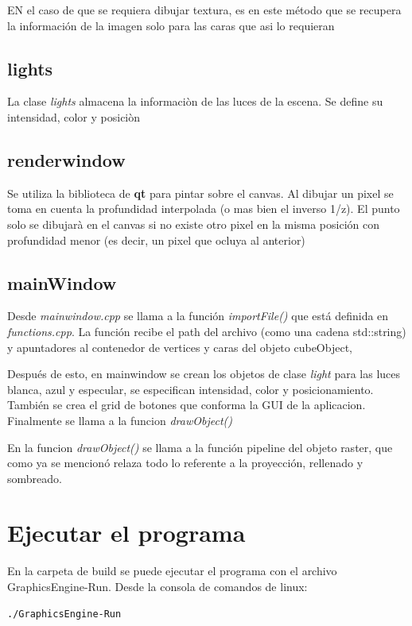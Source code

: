 \documentclass[12pt]{article}
\begin{document}
EN el caso de que se requiera dibujar textura, es en este método que se recupera la información de la imagen solo para las caras que asi lo requieran

\subsection{lights}
La clase \textit{lights} almacena la informaciòn de las luces de la escena. Se define su intensidad, color y posiciòn

\subsection{renderwindow}

Se utiliza la biblioteca de \textbf{qt} para pintar sobre el canvas. Al dibujar un pixel se toma en cuenta la profundidad interpolada (o mas bien el inverso 1/z).
El punto solo se dibujarà en el canvas si no existe otro pixel en la misma posición con profundidad menor (es decir, un pixel que ocluya al anterior)

\subsection{mainWindow}
Desde \textit{mainwindow.cpp} se llama a la función \textit{importFile()} que está definida en \textit{functions.cpp}. La función recibe el path del archivo (como una cadena std::string) y apuntadores al contenedor de vertices y caras del objeto cubeObject,

Después de esto, en mainwindow se crean los objetos de clase \textit{light} para las luces blanca, azul y especular, se especifican intensidad, color y posicionamiento. También se crea el grid de botones que conforma la GUI de la aplicacion. Finalmente se llama a la funcion \textit{drawObject()}

En la funcion  \textit{drawObject()} se llama a la función pipeline del objeto raster, que como ya se mencionó relaza todo lo referente a la proyección, rellenado y sombreado.


\section{Ejecutar el programa}
En la carpeta de build se puede ejecutar el programa con el archivo GraphicsEngine-Run. Desde la consola de comandos de linux:

\begin{lstlisting}[language=bash,title={bash}]
./GraphicsEngine-Run
\end{lstlisting}
\end{document}

